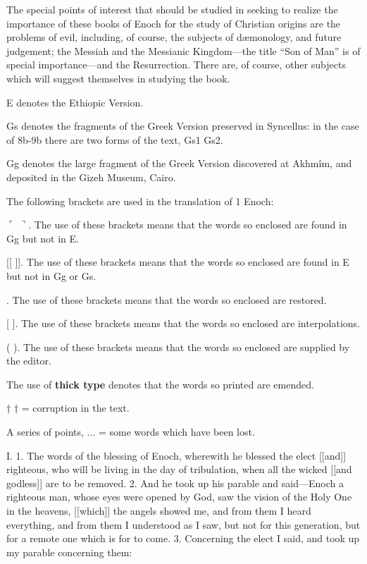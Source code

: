 The special points of interest that should be studied
in seeking to realize the importance of these books of
Enoch for the study of Christian origins are the
problems of evil, including, of course, the subjects
of dæmonology, and future judgement; the Messiah
and the Messianic Kingdom—the title “Son of
Man” is of special importance—and the Resurrection.
There are, of course, other subjects which will
suggest themselves in studying the book.


E denotes the Ethiopic Version.

Gs denotes the fragments of the Greek Version preserved
in Syncellus: in the case of 8b-9b there are two forms of the
text, Gs1 Gs2.

Gg denotes the large fragment of the Greek Version discovered
at Akhmîm, and deposited in the Gizeh Museum,
Cairo.

The following brackets are used in the translation of
1 Enoch:

$\ulcorner$ $\urcorner$. The use of these brackets means that the words so
enclosed are found in Gg but not in E.

[[ ]]. The use of these brackets means that the words so
enclosed are found in E but not in Gg or Gs.

 . The use of these brackets means that the words so
enclosed are restored.

[ ]. The use of these brackets means that the words so
enclosed are interpolations.

( ). The use of these brackets means that the words so
enclosed are supplied by the editor.

The use of \textbf{thick type} denotes that the words so printed
are emended.

† † = corruption in the text.

A series of points, ... = some words which have been lost.



I. 1. The words of the blessing of Enoch, wherewith
he blessed the elect [[and]] righteous, who will
be living in the day of tribulation, when all the
wicked [[and godless]] are to be removed. 2. And
he took up his parable and said—Enoch a righteous
man, whose eyes were opened by God, saw the vision
of the Holy One in the heavens, [[which]] the angels
showed me, and from them I heard everything, and
from them I understood as I saw, but not for this
generation, but for a remote one which is for to come.
3. Concerning the elect I said, and took up my
parable concerning them:

